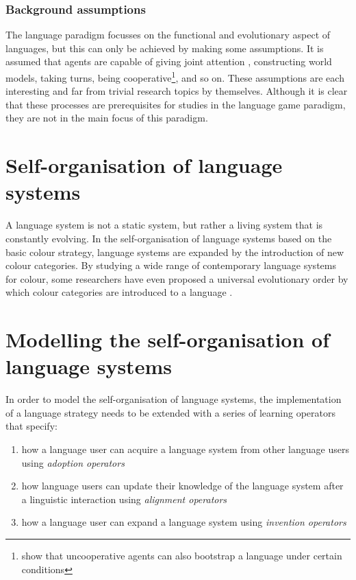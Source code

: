 \subsubsection{Background assumptions}

The language paradigm focusses on the functional and evolutionary
aspect of languages, but this can only be achieved by making some
assumptions. It is assumed that agents are capable of giving joint
attention \citep{tomasello95jointattention}, constructing world
models, taking turns, being cooperative\footnote{\cite{wang08self}
  show that uncooperative agents can also bootstrap a language under
  certain conditions}, and so on. These assumptions are each
interesting and far from trivial research topics by
themselves. Although it is clear that these processes are
prerequisites for studies in the language game paradigm, they are not
in the main focus of this paradigm.

\section{Self-organisation of language systems}

A language system is not a static system, but rather a living system
that is constantly evolving. In the self-organisation of language systems
based on the basic colour strategy, language systems are expanded by
the introduction of new colour categories. By studying a wide range of
contemporary language systems for colour, some researchers have even
proposed a universal evolutionary order by which colour categories are
introduced to a language \citep{berlin69basic}.


\section{Modelling the self-organisation of language systems}

In order to model the self-organisation of language systems, 
the implementation of a language strategy needs
to be extended with a series of learning operators that specify:

\begin{enumerate}
\item how a language user can acquire a language system from other
  language users using \emph{adoption operators}
\item how language users can update their knowledge of the language
  system after a linguistic interaction using \emph{alignment
    operators}
\item how a language user can expand a language system using
  \emph{invention operators}
\end{enumerate}

